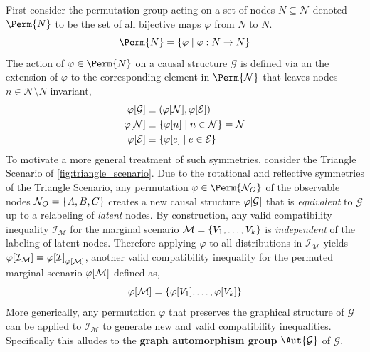 \documentclass[aps, 10pt, english, twoside, pra, nofootinbib, longbibliography]{revtex4-1}
\theoremstyle{plain}
\theoremstyle{definition}
\newtheorem{example}[theorem]{Example}
\theoremstyle{remark}
\newcommand{\graph}{\mathcal{G}}
\newcommand{\nodes}{\mathcal{N}}
\newcommand{\edges}{\mathcal{E}}
\newcommand{\gelem}{\varphi}
\newcommand{\action}[1]{\gelem\bs{#1}}
\newcommand{\mscenario}{\mathcal{M}}
\newcommand{\term}[1]{\textcolor{Mahogany}{\textbf{#1}}}
\begin{document}
    First consider the permutation group acting on a set of nodes $N \subseteq \nodes$ denoted $\Perm{N}$ to be the set of all bijective maps $\gelem$ from $N$ to $N$.
    \[ \Perm{N} = \bc{\gelem \mid \gelem : N \to N} \]
    The action of $\gelem \in \Perm{N}$ on a causal structure $\graph$ is defined via an the extension of $\gelem$ to the corresponding element in $\Perm{\nodes}$ that leaves nodes $n \in \nodes \setminus N$ invariant,
    \begin{align*}
    \action{\graph} &\defined \br{\action{\nodes}, \action{\edges}} \\
    \action{\nodes} &\defined \bc{\action{n} \mid n \in \nodes} = \nodes \\
    \action{\edges} &\defined \bc{\action{e} \mid e \in \edges}
    \end{align*}
    To motivate a more general treatment of such symmetries, consider the Triangle Scenario of \cref{fig:triangle_scenario}. Due to the rotational and reflective symmetries of the Triangle Scenario, any permutation $\gelem \in \Perm{\nodes_O}$ of the observable nodes $\nodes_O = \bc{A, B, C}$ creates a new causal structure $\action{\graph}$ that is \textit{equivalent} to $\graph$ up to a relabeling of \textit{latent} nodes. By construction, any valid compatibility inequality $\mathcal{I}_{\mscenario}$ for the marginal scenario $\mscenario = \bc{V_1, \ldots, V_k}$ is \textit{independent} of the labeling of latent nodes. Therefore applying $\gelem$ to all distributions in $\mathcal{I}_{\mscenario}$ yields $\action{\mathcal{I}_{\mscenario}} \defined \action{\mathcal{I}}_{\action{\mscenario}}$, another valid compatibility inequality for the permuted marginal scenario $\action{\mscenario}$ defined as,
    \[ \action{\mscenario} = \bc{\action{V_1}, \ldots, \action{V_k}} \]
    More generically, any permutation $\gelem$ that preserves the graphical structure of $\graph$ can be applied to $\mathcal{I}_{\mscenario}$ to generate new and valid compatibility inequalities. Specifically this alludes to the \term{graph automorphism group} $\Aut{\graph}$ of $\graph$.
\end{document}
